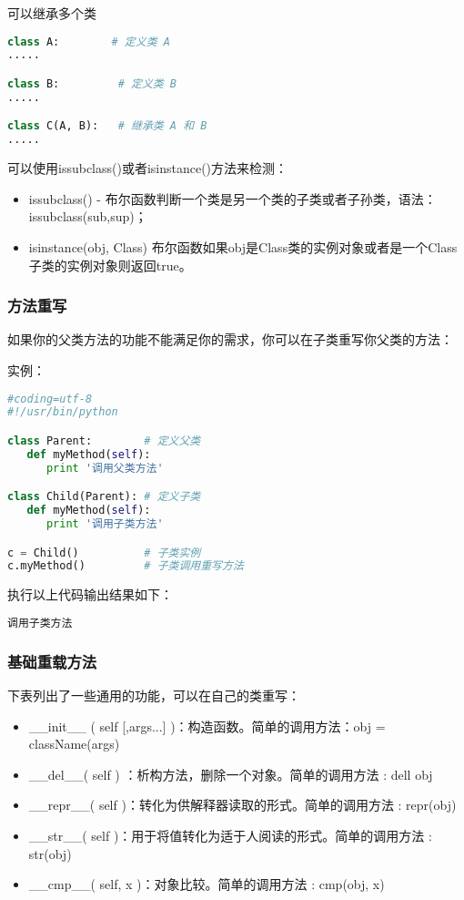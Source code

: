 可以继承多个类
\begin{lstlisting}[language=Python]
class A:        # 定义类 A
.....

class B:         # 定义类 B
.....

class C(A, B):   # 继承类 A 和 B
.....
\end{lstlisting}

可以使用issubclass()或者isinstance()方法来检测：
\begin{itemize}
\item issubclass() - 布尔函数判断一个类是另一个类的子类或者子孙类，语法：issubclass(sub,sup)；
\item isinstance(obj, Class) 布尔函数如果obj是Class类的实例对象或者是一个Class子类的实例对象则返回true。
\end{itemize}



\subsubsection{方法重写}
如果你的父类方法的功能不能满足你的需求，你可以在子类重写你父类的方法：

实例：
\begin{lstlisting}[language=Python]
#coding=utf-8
#!/usr/bin/python

class Parent:        # 定义父类
   def myMethod(self):
      print '调用父类方法'

class Child(Parent): # 定义子类
   def myMethod(self):
      print '调用子类方法'

c = Child()          # 子类实例
c.myMethod()         # 子类调用重写方法
\end{lstlisting}

执行以上代码输出结果如下：
\begin{lstlisting}[language=Python]
调用子类方法
\end{lstlisting}



\subsubsection{基础重载方法}
下表列出了一些通用的功能，可以在自己的类重写：

\begin{itemize}
\item \_\_init\_\_ ( self [,args...] )：构造函数。简单的调用方法：obj = className(args)

\item  \_\_del\_\_( self ) ：析构方法，删除一个对象。简单的调用方法 : dell obj

\item	\_\_repr\_\_( self )：转化为供解释器读取的形式。简单的调用方法 : repr(obj)

\item	\_\_str\_\_( self )：用于将值转化为适于人阅读的形式。简单的调用方法 : str(obj)

\item	\_\_cmp\_\_( self, x )：对象比较。简单的调用方法 : cmp(obj, x)
\end{itemize}



